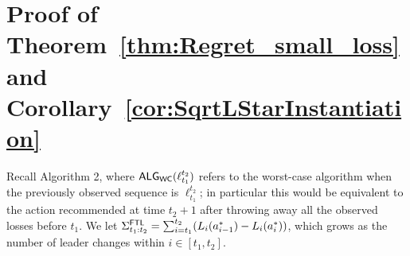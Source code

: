 

    







\section{Proof of Theorem~\ref{thm:Regret_small_loss} and Corollary~\ref{cor:SqrtLStarInstantiation}}

Recall Algorithm 2, where $\mathsf{ALG}_{\mathsf{WC}}(\ell_{t_1}^{t_2})$ refers to the worst-case algorithm when the previously observed sequence is $\ell_{t_1}^{t_2}$; in particular this would be equivalent to the action recommended at time $t_2 + 1$ after throwing away all the observed losses before $t_1$. 
We let $\Sigma^{\mathsf{FTL}}_{t_1:t_2} = 
\sum_{i=t_1}^{t_2} (L_i(a^*_{i-1}) - L_i(a^*_i))$, which grows as the number of leader changes within $i \in [t_1, t_2]$.


